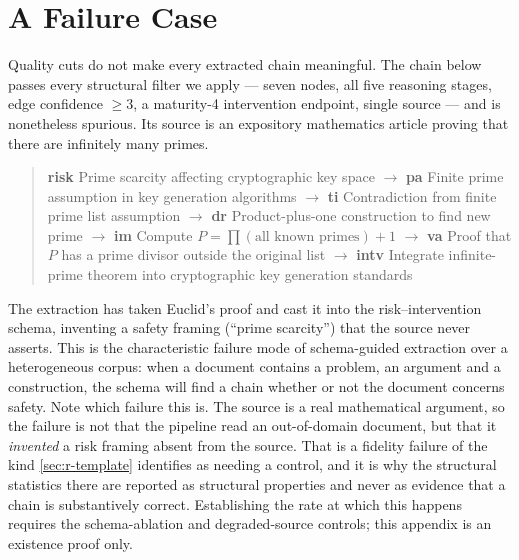 \documentclass[10pt,twocolumn,letterpaper]{article}
\begin{document}
\section{A Failure Case}
\label{app:failure}

Quality cuts do not make every extracted chain meaningful. The chain below passes every
structural filter we apply --- seven nodes, all five reasoning stages, edge confidence
$\geq 3$, a maturity-4 intervention endpoint, single source --- and is nonetheless
spurious. Its source is an expository mathematics article proving that there are
infinitely many primes.

\begin{quote}\small
\textbf{risk} Prime scarcity affecting cryptographic key space $\rightarrow$
\textbf{pa} Finite prime assumption in key generation algorithms $\rightarrow$
\textbf{ti} Contradiction from finite prime list assumption $\rightarrow$
\textbf{dr} Product-plus-one construction to find new prime $\rightarrow$
\textbf{im} Compute $P = \prod(\text{all known primes}) + 1$ $\rightarrow$
\textbf{va} Proof that $P$ has a prime divisor outside the original list
$\rightarrow$ \textbf{intv} Integrate infinite-prime theorem into cryptographic key
generation standards
\end{quote}

The extraction has taken Euclid's proof and cast it into the risk--intervention schema,
inventing a safety framing (``prime scarcity'') that the source never asserts. This is
the characteristic failure mode of schema-guided extraction over a heterogeneous corpus:
when a document contains a problem, an argument and a construction, the schema will find
a chain whether or not the document concerns safety. Note which failure this is. The
source is a real mathematical argument, so the failure is not that the pipeline read an
out-of-domain document, but that it \emph{invented} a risk framing absent from the
source. That is a fidelity failure of the kind \cref{sec:r-template} identifies as
needing a control, and it is why the structural statistics there are reported as
structural properties and never as evidence that a chain is substantively correct.
Establishing the rate at which this happens requires the schema-ablation and
degraded-source controls; this appendix is an existence proof only.


\end{document}
